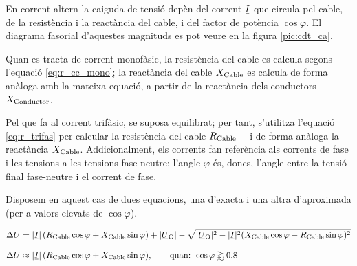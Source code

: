 En corrent altern la caiguda de tensió
depèn del  corrent $\cmplx{I}$ que circula pel cable, de la
resistència i la reactància del  cable, i del factor de
potència $\cos \varphi$. El diagrama fasorial d'aquestes magnituds
es pot veure en la figura \vref{pic:cdt_ca}.

\begin{center}
   
   \label{pic:cdt_ca}
\end{center}

Quan es tracta de corrent monofàsic, la resistència del cable es calcula segons l'equació
\eqref{eq:r_cc_mono}; la reactància del cable $X_\mathrm{Cable}$ es calcula de forma anàloga
amb la mateixa equació, a partir de la reactància dels conductors $X_\mathrm{Conductor}$.

Pel que fa al corrent trifàsic, se suposa equilibrat; per tant, s'utilitza l'equació
\eqref{eq:r_trifas} per calcular la resistència del cable $R_\mathrm{Cable}$ ---i de forma
anàloga la reactància $X_\mathrm{Cable}$. Addicionalment, els corrents fan referència als
corrents de fase i les tensions a les tensions fase-neutre; l'angle $\varphi$ és, doncs,
 l'angle entre la tensió final fase-neutre i el corrent de fase.

Disposem en aquest cas de dues equacions, una d'exacta i una altra d'aproximada (per a valors elevats de $\cos \varphi$).

\begin{subequations}
\begin{align}
   \Delta U &= |\cmplx{I}| \,( R\ped{Cable} \cos \varphi + X\ped{Cable} \sin \varphi) + |\cmplx{U}\ped{O}| - \sqrt{|\cmplx{U}\ped{O}|^2 - |\cmplx{I}|^2 ( X\ped{Cable} \cos \varphi - R\ped{Cable} \sin \varphi )^2} \label{eq:cdt_trif_exact} \\[2ex]
   \Delta U &\approx |\cmplx{I}| \,( R\ped{Cable} \cos \varphi + X\ped{Cable} \sin \varphi), \qquad \text{quan: } \cos \varphi \gtrapprox \num{0,8} \label{eq:cdt_trif_aprox}
\end{align}
\end{subequations}


